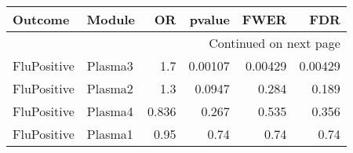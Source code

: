 \documentclass[10pt]{article}
\begin{document}
\begin{longtable}{llrrrr}
\toprule
     Outcome &   Module &    OR &  pvalue &    FWER &     FDR \\
\midrule
\endhead
\midrule
\multicolumn{6}{r}{{Continued on next page}} \\
\midrule
\endfoot

\bottomrule
\endlastfoot
 FluPositive &  Plasma3 &   1.7 & 0.00107 & 0.00429 & 0.00429 \\
 FluPositive &  Plasma2 &   1.3 &  0.0947 &   0.284 &   0.189 \\
 FluPositive &  Plasma4 & 0.836 &   0.267 &   0.535 &   0.356 \\
 FluPositive &  Plasma1 &  0.95 &    0.74 &    0.74 &    0.74 \\
\end{longtable}
\end{document}
